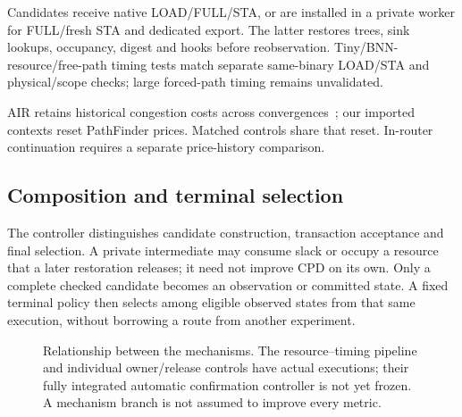 \documentclass[conference,10pt]{IEEEtran}
\begin{document}
Candidates receive native LOAD/FULL/STA, or are installed in a private worker for FULL/fresh STA and dedicated export. The latter restores trees, sink lookups, occupancy, digest and hooks before reobservation. Tiny/BNN-resource/free-path timing tests match separate same-binary LOAD/STA and physical/scope checks; large forced-path timing remains unvalidated.

AIR retains historical congestion costs across convergences~\cite{air}; our imported contexts reset PathFinder prices. Matched controls share that reset. In-router continuation requires a separate price-history comparison.


\subsection{Composition and terminal selection}
The controller distinguishes candidate construction, transaction acceptance and final selection. A private intermediate may consume slack or occupy a resource that a later restoration releases; it need not improve CPD on its own. Only a complete checked candidate becomes an observation or committed state. A fixed terminal policy then selects among eligible observed states from that same execution, without borrowing a route from another experiment.

\begin{figure}[t]
\centering\footnotesize
{}
\caption{Relationship between the mechanisms. The resource--timing pipeline and individual owner/release controls have actual executions; their fully integrated automatic confirmation controller is not yet frozen. A mechanism branch is not assumed to improve every metric.}
\label{fig:method}
\end{figure}
\end{document}
